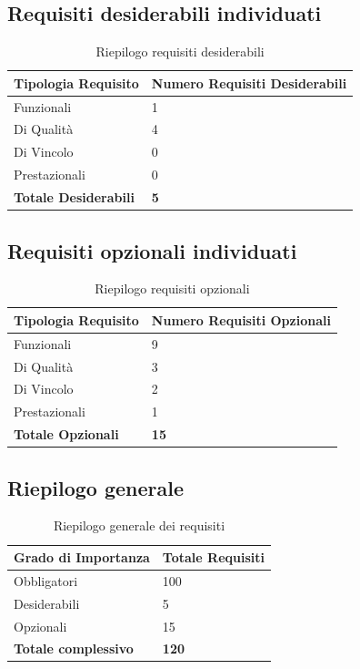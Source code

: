 \subsection{Requisiti desiderabili individuati}
\begin{table}[ht]
	\centering
	\renewcommand{\arraystretch}{1.4}
	\begin{tabularx}{0.8\textwidth}{|l|X|}
		\hline
		\rowcolor{primarycolor!10}
		\textbf{Tipologia Requisito} & \textbf{Numero Requisiti Desiderabili} \\
		\hline
		Funzionali & 1 \\
		\hline
		Di Qualità & 4 \\
		\hline
		Di Vincolo & 0 \\
		\hline
		Prestazionali & 0 \\
		\hline
		\textbf{Totale Desiderabili} & \textbf{5} \\
		\hline
	\end{tabularx}
	\caption{Riepilogo requisiti desiderabili}
\end{table}

\subsection{Requisiti opzionali individuati}
\begin{table}[ht]
	\centering
	\renewcommand{\arraystretch}{1.4}
	\begin{tabularx}{0.8\textwidth}{|l|X|}
		\hline
		\rowcolor{primarycolor!10}
		\textbf{Tipologia Requisito} & \textbf{Numero Requisiti Opzionali} \\
		\hline
		Funzionali & 9 \\
		\hline
		Di Qualità & 3 \\
		\hline
		Di Vincolo & 2 \\
		\hline
		Prestazionali & 1 \\
		\hline
		\textbf{Totale Opzionali} & \textbf{15} \\
		\hline
	\end{tabularx}
	\caption{Riepilogo requisiti opzionali}
\end{table}

\subsection{Riepilogo generale}
\begin{table}[ht]
	\centering
	\renewcommand{\arraystretch}{1.4}
	\begin{tabularx}{0.8\textwidth}{|l|X|}
		\hline
		\rowcolor{primarycolor!10}
		\textbf{Grado di Importanza} & \textbf{Totale Requisiti} \\
		\hline
		Obbligatori & 100 \\
		\hline
		Desiderabili & 5 \\
		\hline
		Opzionali & 15 \\
		\hline
		\textbf{Totale complessivo} & \textbf{120} \\
		\hline
	\end{tabularx}
	\caption{Riepilogo generale dei requisiti}
\end{table}
